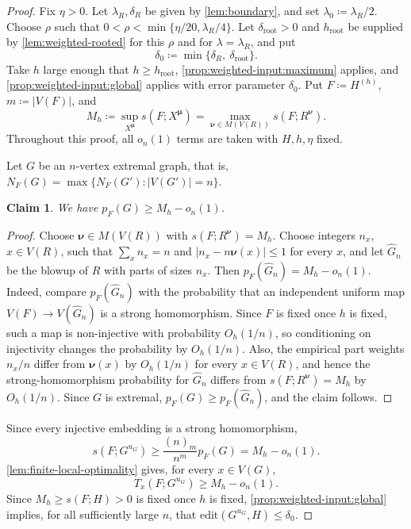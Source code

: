\documentclass[10pt]{article}
\theoremstyle{plain}
\newtheorem{claim}[claim]{Claim}
\theoremstyle{remark}
\newcommand{\bmu}{{\boldsymbol{\mu}}}
\newcommand{\bnu}{{\boldsymbol{\nu}}}
\begin{document}
\begin{proof}
Fix $\eta>0$.
Let $\lambda_R,\delta_R$ be given by \cref{lem:boundary}, and set $\lambda_0\coloneqq\lambda_R/2$. Choose $\rho$ such that $0<\rho<\min\{\eta/20,\lambda_R/4\}$. Let $\delta_{\mathrm{root}}>0$ and $h_{\mathrm{root}}$ be supplied by \cref{lem:weighted-rooted} for this $\rho$ and for $\lambda=\lambda_R$, and put
\[
        \delta_0\coloneqq\min\{\delta_R,~\delta_{\mathrm{root}}\}.
\]
Take $h$ large enough that $h\ge h_{\mathrm{root}}$, \cref{prop:weighted-input:maximum} applies, and \cref{prop:weighted-input:global} applies with error parameter $\delta_0$. Put $F\coloneqq H^{(h)}$, $m\coloneqq |V(F)|$, and
\[
        M_h\coloneqq\sup_{X^\bmu} s(F;X^\bmu)=\max_{\bnu\in M(V(R))} s(F;R^\bnu).
\]
Throughout this proof, all $o_n(1)$ terms are taken with $H,h,\eta$ fixed.

Let $G$ be an $n$-vertex extremal graph, that is, $N_F(G)=\max\{N_F(G'):|V(G')|=n\}$.

\begin{claim}
\label{claim:extremal-density-lower-bound}
We have $p_F(G)\ge M_h-o_n(1)$.
\end{claim}

\begin{proof}
Choose $\bnu\in M(V(R))$ with $s(F;R^\bnu)=M_h$. Choose integers $n_x$, $x\in V(R)$, such that $\sum_x n_x=n$ and $|n_x-n\bnu(x)|\le1$ for every $x$, and let $\hat G_n$ be the blowup of $R$ with parts of sizes $n_x$. Then $p_F(\hat G_n)=M_h-o_n(1)$. Indeed, compare $p_F(\hat G_n)$ with the probability that an independent uniform map $V(F)\to V(\hat G_n)$ is a strong homomorphism. Since $F$ is fixed once $h$ is fixed, such a map is non-injective with probability $O_h(1/n)$, so conditioning on injectivity changes the probability by $O_h(1/n)$. Also, the empirical part weights $n_x/n$ differ from $\bnu(x)$ by $O_h(1/n)$ for every $x\in V(R)$, and hence the strong-homomorphism probability for $\hat G_n$ differs from $s(F;R^\bnu)=M_h$ by $O_h(1/n)$. Since $G$ is extremal, $p_F(G)\ge p_F(\hat G_n)$, and the claim follows.
\end{proof}

Since every injective embedding is a strong homomorphism,
\[
        s(F;G^{u_G})\ge \frac{(n)_m}{n^m}p_F(G)=M_h-o_n(1).
\]
\cref{lem:finite-local-optimality} gives, for every $x\in V(G)$,
\begin{equation}
\label{eq:all-vertices-rooted}
        T_x(F;G^{u_G})\ge M_h-o_n(1).
\end{equation}
Since $M_h\ge s(F;H)>0$ is fixed once $h$ is fixed, \cref{prop:weighted-input:global} implies, for all sufficiently large $n$, that $\mathrm{edit}(G^{u_G},H)\le\delta_0$.


\end{proof}
\end{document}
